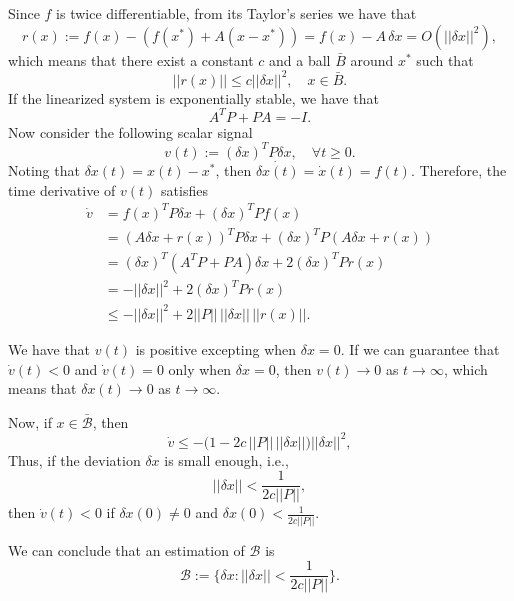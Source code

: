Since $f$ is twice differentiable, from its Taylor's series we have that
\begin{equation}
	r(x) := f(x) - (f(x^*) + A(x - x^*)) = f(x) - A\,\delta x = O(||\delta x||^2),
\end{equation}
which means that there exist a constant $c$ and a ball $\bar B$ around $x^*$ such that
\begin{equation}
	||r(x)|| \leq c||\delta x||^2, \quad x\in\bar B.
\end{equation}
If the linearized system is exponentially stable, we have that
\begin{equation}
A^TP + PA = -I.
\end{equation}
Now consider the following scalar signal
\begin{equation}
	v(t) := (\delta x)^T P \delta x, \quad \forall t\geq 0.
\end{equation}
Noting that $\delta x(t) = x(t) - x^*$, then $\dot{\delta x(t)} = \dot x(t) = f(t)$. Therefore, the time derivative of $v(t)$ satisfies
\begin{align}
	\dot v &= f(x)^T P \delta x + (\delta x)^T P f(x) \nonumber \\
	&= (A\delta x + r(x))^T P \delta x + (\delta x)^T P (A\delta x + r(x)) \nonumber \\
	&= (\delta x)^T(A^T P + PA)\delta x + 2(\delta x)^T P r(x) \nonumber \\
	&= -||\delta x||^2 + 2(\delta x)^T P r(x) \nonumber \\
	&\leq -||\delta x||^2 + 2 ||P||\, ||\delta x|| \, ||r(x)||.
\end{align}

We have that $v(t)$ is positive excepting when $\delta x = 0$. If we can guarantee that $\dot v(t) < 0$ and $\dot v(t) = 0$ only when $\delta x = 0$, then $v(t) \to 0$ as $t\to\infty$, which means that $\delta x(t) \to 0$ as $t\to\infty$.

Now, if $x\in\mathcal{\bar B}$, then
\begin{equation}
	\dot v \leq -\Big(1 - 2c\,||P||\,||\delta x||\Big)||\delta x||^2,
\end{equation}
Thus, if the deviation $\delta x$ is small enough, i.e.,
\begin{equation}
||\delta x|| < \frac{1}{2c||P||},
\end{equation}
then $\dot v(t) < 0$ if $\delta x(0) \neq 0$ and $\delta x(0) < \frac{1}{2c||P||}$.

We can conclude that an estimation of $\mathcal B$ is
\begin{equation}
	\mathcal{B} := \{ \delta x : ||\delta x|| < \frac{1}{2c||P||} \}.
	\label{eq: Bregion}
\end{equation}

